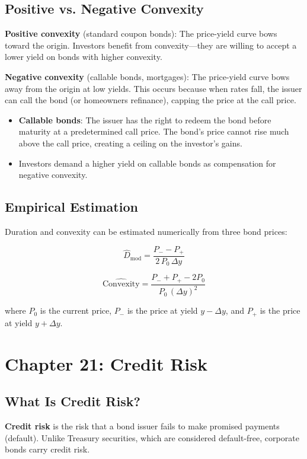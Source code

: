 \documentclass[11pt,letterpaper]{report}
\begin{document}
\section{Positive vs. Negative Convexity}


\textbf{Positive convexity} (standard coupon bonds): The price-yield curve bows toward the origin.  Investors benefit from convexity---they are willing to accept a lower yield on bonds with higher convexity.

\textbf{Negative convexity} (callable bonds, mortgages): The price-yield curve bows away from the origin at low yields.  This occurs because when rates fall, the issuer can call the bond (or homeowners refinance), capping the price at the call price.

\begin{itemize}
  \item \textbf{Callable bonds}: The issuer has the right to redeem the bond before maturity at a predetermined call price.  The bond's price cannot rise much above the call price, creating a ceiling on the investor's gains.
  \item Investors demand a higher yield on callable bonds as compensation for negative convexity.
\end{itemize}

\section{Empirical Estimation}


Duration and convexity can be estimated numerically from three bond prices:

$$\widehat{D}_{\text{mod}} = \frac{P_{-} - P_{+}}{2 \, P_0 \, \Delta y}$$

$$\widehat{\text{Convexity}} = \frac{P_{-} + P_{+} - 2P_0}{P_0 \, (\Delta y)^2}$$

where $P_0$ is the current price, $P_{-}$ is the price at yield $y - \Delta y$, and $P_{+}$ is the price at yield $y + \Delta y$.


\chapter{Chapter 21: Credit Risk}


\section{What Is Credit Risk?}


\textbf{Credit risk} is the risk that a bond issuer fails to make promised payments (default).  Unlike Treasury securities, which are considered default-free, corporate bonds carry credit risk.
\end{document}

